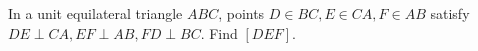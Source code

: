 In a unit equilateral triangle $ABC$, points $D\in BC,E\in CA,F\in AB$ satisfy $DE\perp CA,EF\perp AB,FD\perp BC$. Find $[DEF]$.
